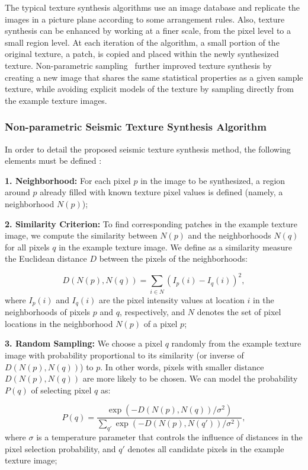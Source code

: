 \documentclass{ieeeaccess}
\begin{document}
The typical texture synthesis algorithms use an image database and replicate the images in a picture plane according to some arrangement rules. Also, texture synthesis can be enhanced by working at a finer scale, from the pixel level to a small region level. At each iteration of the algorithm, a small portion of the original texture, a patch, is copied and placed within the newly synthesized texture. Non-parametric sampling~\cite{Efros1999} further improved texture synthesis by creating a new image that shares the same statistical properties as a given sample texture, while avoiding explicit models of the texture by sampling directly from the example texture images.


\subsubsection{Non-parametric Seismic Texture Synthesis Algorithm}

In order to detail the proposed seismic texture synthesis method, the following elements must be defined :

\textbf{1. Neighborhood:} For each pixel $p$ in the image to be synthesized, a region around $p$ already filled with known texture pixel values is defined (namely, a neighborhood $N(p)$);

\textbf{2. Similarity Criterion:} To find corresponding patches in the example texture image, we compute the similarity between $N(p)$ and the neighborhoods $N(q)$ for all pixels $q$ in the example texture image. We define as a similarity measure the Euclidean distance $D$ between the pixels of the neighborhoods:

\begin{equation}
D(N(p), N(q)) = \sum_{i \in N} \left( I_p(i) - I_q(i) \right)^2,
\end{equation}
where $I_p(i)$ and $I_q(i)$ are the pixel intensity values at location $i$ in the neighborhoods of pixels $p$ and $q$, respectively, and $N$ denotes the set of pixel locations in the neighborhood $N(p)$ of a pixel $p$;

\textbf{3. Random Sampling:} We choose a pixel $q$ randomly from the example texture image with probability proportional to its similarity (or inverse of $D(N(p), N(q))$) to $p$. In other words, pixels with smaller distance $D(N(p), N(q))$ are more likely to be chosen. We can model the probability $P(q)$ of selecting pixel $q$ as:

\begin{equation}
P(q) = \frac{\exp(-D(N(p), N(q)) / \sigma^2)}{\sum_{q'} \exp(-D(N(p), N(q')) / \sigma^2)},
\end{equation}
where $\sigma$ is a temperature parameter that controls the influence of distances in the pixel selection probability, and $q'$ denotes all candidate pixels in the example texture image;
\end{document}
